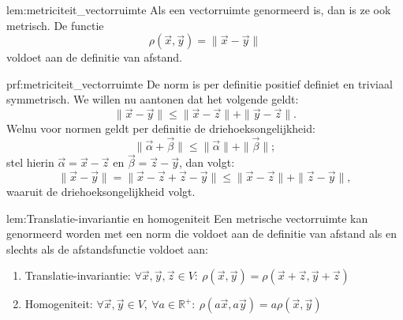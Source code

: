 \begin{lem}{lem:metriciteit_vectorruimte}
    Als een vectorruimte genormeerd is, dan is ze ook metrisch. De functie
    \begin{equation*}
        \rho(\vec{x},\vec{y}) = \|\vec{x} - \vec{y}\|
    \end{equation*}
    voldoet aan de definitie van afstand.
\end{lem}

\newpage

\begin{prf}{prf:metriciteit_vectorruimte}
    De norm is per definitie positief definiet en triviaal symmetrisch. We willen nu aantonen dat het volgende geldt:
    \begin{equation*}
        \| \vec{x} - \vec{y} \| \leq \| \vec{x} - \vec{z} \| + \| \vec{y} - \vec{z} \|.
    \end{equation*}
    Welnu voor normen geldt per definitie de driehoeksongelijkheid:
    \begin{equation*}
        \|\vec{\alpha} + \vec{\beta}\| \leq \|\vec{\alpha}\| + \|\vec{\beta}\|;
    \end{equation*}
    stel hierin $\vec{\alpha} = \vec{x} - \vec{z}$ en $\vec{\beta} = \vec{z} - \vec{y}$, dan volgt:
    \begin{equation*}
        \|\vec{x} - \vec{y}\| = \|\vec{x} - \vec{z} + \vec{z} - \vec{y}\| \leq \|\vec{x} - \vec{z}\| + \|\vec{z} - \vec{y}\|,
    \end{equation*}
    waaruit de driehoeksongelijkheid volgt.
\end{prf}

\begin{lem}{lem:Translatie-invariantie en homogeniteit}
    Een metrische vectorruimte kan genormeerd worden met een norm die voldoet aan de definitie van afstand als en slechts als de afstandsfunctie voldoet aan:
    \begin{enumerate}
        \item Translatie-invariantie: $\forall \vec{x},\vec{y},\vec{z} \in V: \ \rho(\vec{x},\vec{y}) = \rho(\vec{x} + \vec{z},\vec{y} + \vec{z})$
        \item Homogeniteit: $\forall \vec{x},\vec{y} \in V,\ \forall a \in \mathbb{R}^+: \ \rho(a\vec{x},a\vec{y}) = a\rho(\vec{x},\vec{y})$
    \end{enumerate}
\end{lem}

